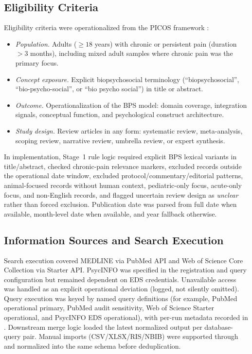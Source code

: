 \documentclass[11pt]{article}
\begin{document}
\subsection{Eligibility Criteria}
Eligibility criteria were operationalized from the PICOS framework \citep{schardt2007, moher2009}:
\begin{itemize}[leftmargin=*, noitemsep]
  \item \textit{Population.} Adults ($\geq 18$ years) with chronic or persistent pain (duration $>3$ months), including mixed adult samples where chronic pain was the primary focus.
  \item \textit{Concept exposure.} Explicit biopsychosocial terminology (``biopsychosocial'', ``bio-psycho-social'', or ``bio psycho social'') in title or abstract.
  \item \textit{Outcome.} Operationalization of the BPS model: domain coverage, integration signals, conceptual function, and psychological construct architecture.
  \item \textit{Study design.} Review articles in any form: systematic review, meta-analysis, scoping review, narrative review, umbrella review, or expert synthesis.
\end{itemize}
In implementation, Stage~1 rule logic required explicit BPS lexical variants in title/abstract, checked chronic-pain relevance markers, excluded records outside the operational date window, excluded protocol/commentary/editorial patterns, animal-focused records without human context, pediatric-only focus, acute-only focus, and non-English records, and flagged uncertain review design as \textit{unclear} rather than forced exclusion. Publication date was parsed from full date when available, month-level date when available, and year fallback otherwise.

\subsection{Information Sources and Search Execution}
Search execution covered MEDLINE via PubMed API and Web of Science Core Collection via Starter API. PsycINFO was specified in the registration and query configuration but remained dependent on EDS credentials. Unavailable access was handled as an explicit operational deviation (logged, not silently omitted). Query execution was keyed by named query definitions (for example, PubMed operational primary, PubMed audit sensitivity, Web of Science Starter operational, and PsycINFO EDS operational), with per-run metadata recorded in . Downstream merge logic loaded the latest normalized output per database-query pair. Manual imports (CSV/XLSX/RIS/NBIB) were supported through  and normalized into the same schema before deduplication.
\end{document}
